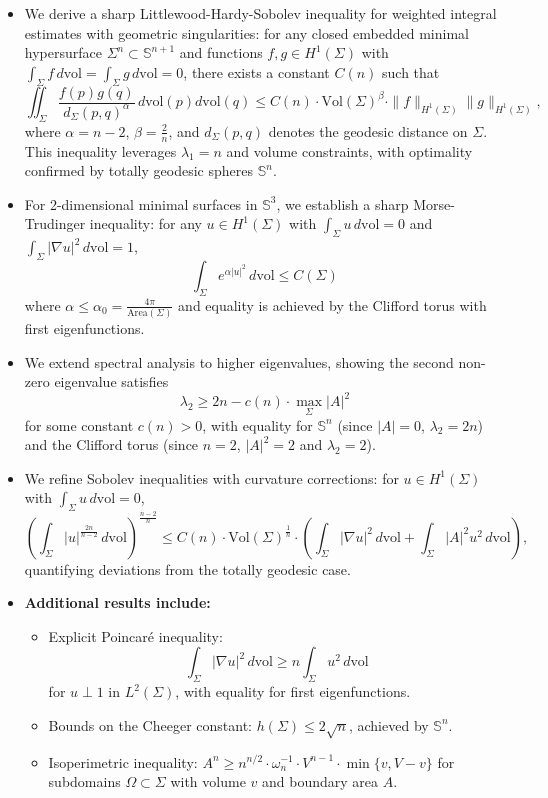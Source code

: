 \documentclass[a4, 12pt]{amsart}
\numberwithin{equation}{section} \numberwithin{equation}{section}
\begin{document}
\begin{itemize}
\item[(i)] We derive a sharp Littlewood-Hardy-Sobolev inequality for weighted integral estimates with geometric singularities: for any closed embedded minimal hypersurface $\Sigma^n \subset \mathbb{S}^{n+1}$ and functions $f, g \in H^1(\Sigma)$ with $\int_\Sigma f \, d\mathrm{vol} = \int_\Sigma g \, d\mathrm{vol} = 0$, there exists a constant $C(n)$ such that
\[
\iint_\Sigma \frac{f(p)g(q)}{d_\Sigma(p,q)^{\alpha}} \, d\mathrm{vol}(p)d\mathrm{vol}(q) \leq C(n) \cdot \text{Vol}(\Sigma)^{\beta} \cdot \|f\|_{H^1(\Sigma)} \|g\|_{H^1(\Sigma)},
\]
where $\alpha = n-2$, $\beta = \frac{2}{n}$, and $d_\Sigma(p,q)$ denotes the geodesic distance on $\Sigma$. This inequality leverages $\lambda_1 = n$ and volume constraints, with optimality confirmed by totally geodesic spheres $\mathbb{S}^n$.

\item[(ii)] For 2-dimensional minimal surfaces in $\mathbb{S}^3$, we establish a sharp Morse-Trudinger inequality: for any $u \in H^1(\Sigma)$ with $\int_\Sigma u \, d\mathrm{vol} = 0$ and $\int_\Sigma |\nabla u|^2 \, d\mathrm{vol} = 1$,
\[
\int_\Sigma e^{\alpha |u|^2} \, d\mathrm{vol} \leq C(\Sigma)
\]
where $\alpha \leq \alpha_0 = \frac{4\pi}{\text{Area}(\Sigma)}$ and equality is achieved by the Clifford torus with first eigenfunctions.

\item[(iii)] We extend spectral analysis to higher eigenvalues, showing the second non-zero eigenvalue satisfies
\[
\lambda_2 \geq 2n - c(n) \cdot \max_\Sigma |A|^2
\]
for some constant $c(n) > 0$, with equality for $\mathbb{S}^n$ (since $|A| = 0$, $\lambda_2 = 2n$) and the Clifford torus (since $n=2$, $|A|^2 = 2$ and $\lambda_2 = 2$).

\item[(iv)] We refine Sobolev inequalities with curvature corrections: for $u \in H^1(\Sigma)$ with $\int_\Sigma u \, d\mathrm{vol} = 0$,
\[
\left( \int_\Sigma |u|^{\frac{2n}{n-2}} \, d\mathrm{vol} \right)^{\frac{n-2}{n}} \leq C(n) \cdot \text{Vol}(\Sigma)^{\frac{1}{n}} \cdot \left( \int_\Sigma |\nabla u|^2 \, d\mathrm{vol} + \int_\Sigma |A|^2 u^2 \, d\mathrm{vol} \right),
\]
quantifying deviations from the totally geodesic case.

\item[(v)] \textbf{Additional results include:}
  \begin{itemize}
  \item[(i)] Explicit Poincar\'{e} inequality: $$\int_\Sigma |\nabla u|^2 \, d\mathrm{vol} \geq n \int_\Sigma u^2 \, d\mathrm{vol}$$ for $u \perp 1$ in $L^2(\Sigma)$, with equality for first eigenfunctions.
  \item[(ii)] Bounds on the Cheeger constant: $h(\Sigma) \leq 2\sqrt{n}$, achieved by $\mathbb{S}^n$.
  \item[(iii)] Isoperimetric inequality: $A^n \geq n^{n/2} \cdot \omega_n^{-1} \cdot V^{n-1} \cdot \min\{v, V-v\}$ for subdomains $\Omega \subset \Sigma$ with volume $v$ and boundary area $A$.
  \end{itemize}


\end{itemize}
\end{document}
